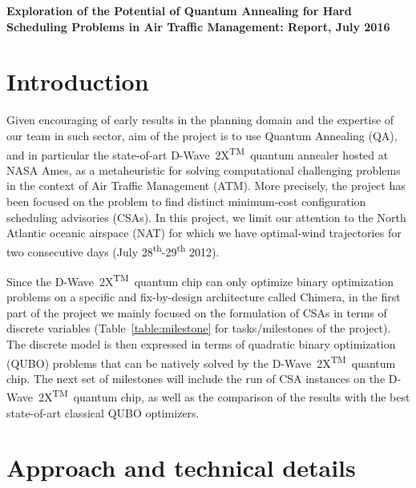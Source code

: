 \documentclass[9pt]{extarticle}
\renewcommand{\tablename}{Table}
\newcommand{\DW}{\mbox{D-Wave 2X\textsuperscript{TM}}~}
\begin{document}
\begin{center}\Large
\textbf{Exploration of the Potential of Quantum Annealing for Hard Scheduling
Problems in Air Traffic Management: Report, July 2016}
\end{center}

\def\changemargin#1#2{\list{}{\rightmargin#2\leftmargin#1}\item[]}
\let\endchangemargin=\endlist 

\section*{Introduction}\label{sec:intro}

Given encouraging of early results in the planning domain \cite{rieffel:15,venturelli:15}
and the expertise of our team in such sector, 
aim of the project is to use Quantum Annealing (QA), and in particular the state-of-art \DW quantum annealer hosted at NASA Ames, 
as a metaheuristic for solving computational challenging problems in the context of
Air Traffic Management (ATM). More precisely, the project has been focused on the problem to find distinct minimum-cost configuration scheduling advisories (CSAs).
In this project, we limit our attention to the North Atlantic oceanic airspace (NAT) for which we have optimal-wind trajectories
for two consecutive days (July 28\textsuperscript{th}-29\textsuperscript{th} 2012).

Since the \DW quantum chip can only optimize binary optimization problems on a specific and fix-by-design architecture called Chimera,
in the first part of the project we mainly focused on the formulation of CSAs in terms of discrete variables (\tablename~\ref{table:milestone} for tasks/milestones
of the project). The discrete model is then expressed in terms of quadratic binary optimization (QUBO) problems that can be natively solved by 
the \DW quantum chip. The next set of milestones will include the run of CSA instances on the \DW quantum chip, as well as the comparison of the results
with the best state-of-art classical QUBO optimizers.

\section*{Approach and technical details}\label{sec:approach}
\end{document}
